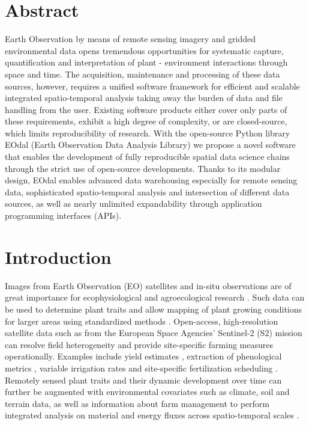 \section*{Abstract}
Earth Observation by means of remote sensing imagery and gridded environmental data opens tremendous opportunities for systematic capture, quantification and interpretation of plant - environment interactions through space and time. The acquisition, maintenance and processing of these data sources, however, requires a unified software framework for efficient and scalable integrated spatio-temporal analysis taking away the burden of data and file handling from the user. Existing software products either cover only parts of these requirements, exhibit a high degree of complexity, or are closed-source, which limits reproducibility of research. With the open-source Python library EOdal (Earth Observation Data Analysis Library) we propose a novel software that enables the development of fully reproducible spatial data science chains through the strict use of open-source developments.
Thanks to its modular design, EOdal enables advanced data warehousing especially for remote sensing data, sophisticated spatio-temporal analysis and intersection of different data sources, as well as nearly unlimited expandability through application programming interfaces (APIs).

\section{Introduction}
Images from Earth Observation (EO) satellites and in-situ observations are of great importance for ecophysiological \citep{caparros-santiago_land_2021} and agroecological research \citep{karthikeyan_review_2020}. Such data can be used to determine plant traits and allow mapping of plant growing conditions for larger areas using standardized methods \citep{weiss_remote_2020}. Open-access, high-resolution satellite data such as from the European Space Agencies' Sentinel-2 (S2) mission can resolve field heterogeneity and provide site-specific farming measures operationally. Examples include yield estimates \citep{marshall_optimizing_2018,perich_pixel-based_2022}, extraction of phenological metrics \citep{duarte_qphenometrics_2018}, variable irrigation rates \citep{barker_evaluation_2018} and site-specific fertilization scheduling \citep{mittermayer_analysis_2022}. Remotely sensed plant traits and their dynamic development over time  can further be augmented with environmental covariates such as climate, soil and terrain data, as well as information about farm management to perform integrated analysis on material and energy fluxes across spatio-temporal scales \citep{asam_relationship_2018}.

